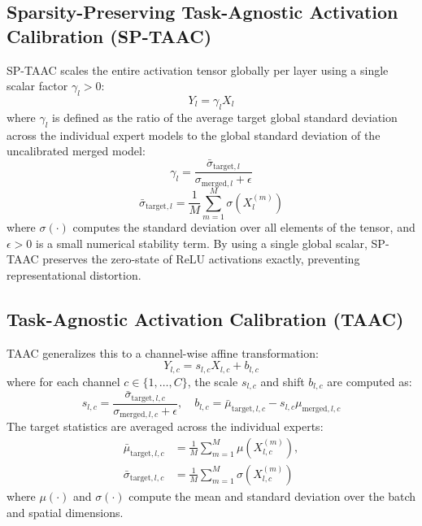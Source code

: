 \documentclass{article}
\theoremstyle{plain}
\theoremstyle{definition}
\theoremstyle{remark}
\begin{document}
\subsection{Sparsity-Preserving Task-Agnostic Activation Calibration (SP-TAAC)}
SP-TAAC scales the entire activation tensor globally per layer using a single scalar factor $\gamma_l > 0$:
\begin{equation}
    Y_{l} = \gamma_l X_l
\end{equation}
where $\gamma_l$ is defined as the ratio of the average target global standard deviation across the individual expert models to the global standard deviation of the uncalibrated merged model:
\begin{equation}
    \gamma_l = \frac{\bar{\sigma}_{\text{target}, l}}{\sigma_{\text{merged}, l} + \epsilon}
\end{equation}
\begin{equation}
    \bar{\sigma}_{\text{target}, l} = \frac{1}{M} \sum_{m=1}^{M} \sigma(X_l^{(m)})
\end{equation}
where $\sigma(\cdot)$ computes the standard deviation over all elements of the tensor, and $\epsilon > 0$ is a small numerical stability term. By using a single global scalar, SP-TAAC preserves the zero-state of ReLU activations exactly, preventing representational distortion.

\subsection{Task-Agnostic Activation Calibration (TAAC)}
TAAC generalizes this to a channel-wise affine transformation:
\begin{equation}
    Y_{l, c} = s_{l, c} X_{l, c} + b_{l, c}
\end{equation}
where for each channel $c \in \{1, \dots, C\}$, the scale $s_{l, c}$ and shift $b_{l, c}$ are computed as:
\begin{equation}
    s_{l, c} = \frac{\bar{\sigma}_{\text{target}, l, c}}{\sigma_{\text{merged}, l, c} + \epsilon}, \quad b_{l, c} = \bar{\mu}_{\text{target}, l, c} - s_{l, c} \mu_{\text{merged}, l, c}
\end{equation}
The target statistics are averaged across the individual experts:
\begin{align}
    \bar{\mu}_{\text{target}, l, c} &= \frac{1}{M} \sum_{m=1}^{M} \mu(X_{l, c}^{(m)}), \nonumber \\
    \bar{\sigma}_{\text{target}, l, c} &= \frac{1}{M} \sum_{m=1}^{M} \sigma(X_{l, c}^{(m)})
\end{align}
where $\mu(\cdot)$ and $\sigma(\cdot)$ compute the mean and standard deviation over the batch and spatial dimensions.
\end{document}
